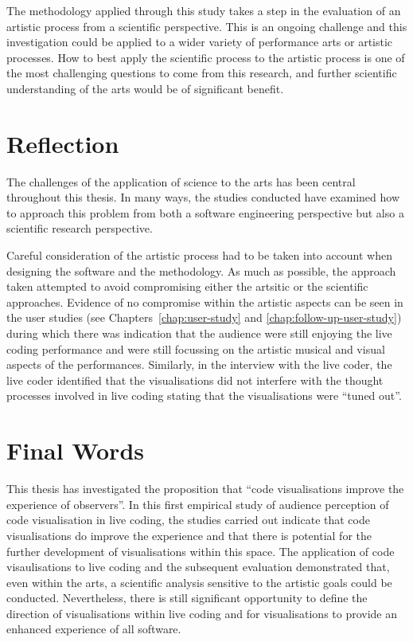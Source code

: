 The methodology applied through this study takes a step in the evaluation of an artistic process from a scientific perspective. This is an ongoing challenge and this investigation could be applied to a wider variety of performance arts or artistic processes. How to best apply the scientific process to the artistic process is one of the most challenging questions to come from this research, and further scientific understanding of the arts would be of significant benefit.

\section{Reflection}

The challenges of the application of science to the arts has been central throughout this thesis. In many ways, the studies conducted have examined how to approach this problem from both a software engineering perspective but also a scientific research perspective.

Careful consideration of the artistic process had to be taken into account when designing the software and the methodology. As much as possible, the approach taken attempted to avoid compromising either the artsitic or the scientific approaches. Evidence of no compromise within the artistic aspects can be seen in the user studies (see Chapters~\ref{chap:user-study} and \ref{chap:follow-up-user-study}) during which there  was indication that the audience were still enjoying the live coding performance and were still focussing on the artistic musical and visual aspects of the performances. Similarly, in the interview with the live coder, the live coder identified that the visualisations did not interfere with the thought processes involved in live coding stating that the visualisations were ``tuned out''.




\section{Final Words}

This thesis has investigated the proposition that ``code visualisations improve the experience of observers''. In this first empirical study of audience perception of code visualisation in live coding, the studies carried out indicate that code visualisations do improve the experience and that there is potential for the further development of visualisations within this space. The application of code visaulisations to live coding and the subsequent evaluation demonstrated that, even within the arts, a scientific analysis sensitive to the artistic goals could be conducted. Nevertheless, there is still significant opportunity to define the direction of visualisations within live coding and for visualisations to provide an enhanced experience of all software.


